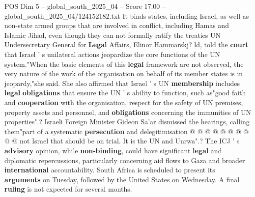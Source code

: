 \begin{textsample}{POS Dim 5 – global\_south\_2025\_04 – Score 17.00 – global\_south\_2025\_04/124152182.txt}
It binds states, including Israel, as well as non-state armed groups that are involved in conflict, including Hamas and Islamic Jihad, even though they can not formally ratify the treaties UN Undersecretary General for \textbf{Legal} Affairs, Elinor Hammarskj? ld, told the \textbf{court} that Israel ' s unilateral actions jeopardize the core functions of the UN system."When the basic elements of this \textbf{legal} framework are not observed, the very nature of the work of the organisation on behalf of its member states is in jeopardy,"she said.
She also affirmed that Israel ' s UN \textbf{membership} includes \textbf{legal} \textbf{obligations} that ensure the UN ' s ability to function, such as"good faith and \textbf{cooperation} with the organisation, respect for the safety of UN premises, property assets and personnel, and \textbf{obligations} concerning the immunities of UN properties".?
Israeli Foreign Minister Gideon Sa'ar dismissed the hearings, calling them"part of a systematic \textbf{persecution} and delegitimisation @ @ @ @ @ @ @ @ @ @ not Israel that should be on trial.
It is the UN and Unrwa".?
The ICJ ' s \textbf{advisory} opinion, while \textbf{non-binding}, could have significant \textbf{legal} and diplomatic repercussions, particularly concerning aid flows to Gaza and broader \textbf{international} accountability.
South Africa is scheduled to present its \textbf{arguments} on Tuesday, followed by the United States on Wednesday.
A final \textbf{ruling} is not expected for several months.

\end{textsample}
